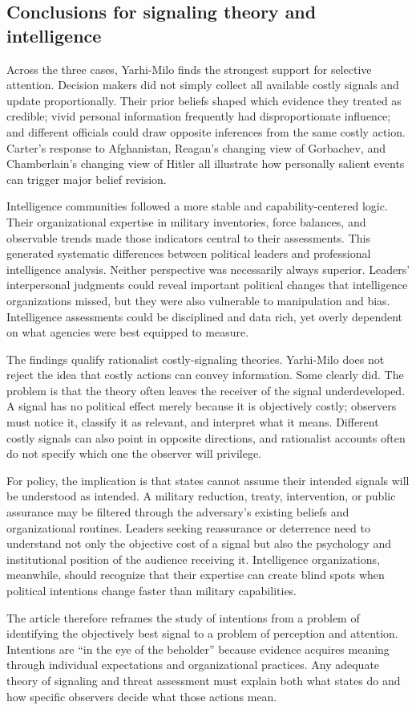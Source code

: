 \subsection{Conclusions for signaling theory and intelligence}

Across the three cases, Yarhi-Milo finds the strongest support for selective attention. Decision makers did not simply collect all available costly signals and update proportionally. Their prior beliefs shaped which evidence they treated as credible; vivid personal information frequently had disproportionate influence; and different officials could draw opposite inferences from the same costly action. Carter's response to Afghanistan, Reagan's changing view of Gorbachev, and Chamberlain's changing view of Hitler all illustrate how personally salient events can trigger major belief revision.

Intelligence communities followed a more stable and capability-centered logic. Their organizational expertise in military inventories, force balances, and observable trends made those indicators central to their assessments. This generated systematic differences between political leaders and professional intelligence analysis. Neither perspective was necessarily always superior. Leaders' interpersonal judgments could reveal important political changes that intelligence organizations missed, but they were also vulnerable to manipulation and bias. Intelligence assessments could be disciplined and data rich, yet overly dependent on what agencies were best equipped to measure.

The findings qualify rationalist costly-signaling theories. Yarhi-Milo does not reject the idea that costly actions can convey information. Some clearly did. The problem is that the theory often leaves the receiver of the signal underdeveloped. A signal has no political effect merely because it is objectively costly; observers must notice it, classify it as relevant, and interpret what it means. Different costly signals can also point in opposite directions, and rationalist accounts often do not specify which one the observer will privilege.

For policy, the implication is that states cannot assume their intended signals will be understood as intended. A military reduction, treaty, intervention, or public assurance may be filtered through the adversary's existing beliefs and organizational routines. Leaders seeking reassurance or deterrence need to understand not only the objective cost of a signal but also the psychology and institutional position of the audience receiving it. Intelligence organizations, meanwhile, should recognize that their expertise can create blind spots when political intentions change faster than military capabilities.

The article therefore reframes the study of intentions from a problem of identifying the objectively best signal to a problem of perception and attention. Intentions are ``in the eye of the beholder'' because evidence acquires meaning through individual expectations and organizational practices. Any adequate theory of signaling and threat assessment must explain both what states do and how specific observers decide what those actions mean.
